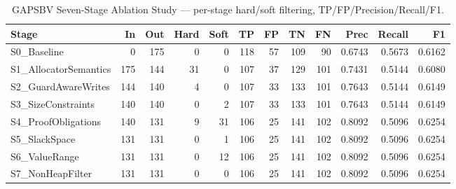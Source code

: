 \begin{table}[t]
\centering
\caption{GAPSBV Seven-Stage Ablation Study — per-stage hard/soft filtering, TP/FP/Precision/Recall/F1.}
\label{tab:gapsbv_ablation}
\begin{tabular}{lrrrrrrrrrrr}
\toprule
Stage & In & Out & Hard & Soft & TP & FP & TN & FN & Prec & Recall & F1 \\
\midrule
  S0_Baseline & 0 & 175 & 0 & 0 & 118 & 57 & 109 & 90 & 0.6743 & 0.5673 & 0.6162 \\
  S1_AllocatorSemantics & 175 & 144 & 31 & 0 & 107 & 37 & 129 & 101 & 0.7431 & 0.5144 & 0.6080 \\
  S2_GuardAwareWrites & 144 & 140 & 4 & 0 & 107 & 33 & 133 & 101 & 0.7643 & 0.5144 & 0.6149 \\
  S3_SizeConstraints & 140 & 140 & 0 & 2 & 107 & 33 & 133 & 101 & 0.7643 & 0.5144 & 0.6149 \\
  S4_ProofObligations & 140 & 131 & 9 & 31 & 106 & 25 & 141 & 102 & 0.8092 & 0.5096 & 0.6254 \\
  S5_SlackSpace & 131 & 131 & 0 & 1 & 106 & 25 & 141 & 102 & 0.8092 & 0.5096 & 0.6254 \\
  S6_ValueRange & 131 & 131 & 0 & 12 & 106 & 25 & 141 & 102 & 0.8092 & 0.5096 & 0.6254 \\
  S7_NonHeapFilter & 131 & 131 & 0 & 0 & 106 & 25 & 141 & 102 & 0.8092 & 0.5096 & 0.6254 \\
\bottomrule
\end{tabular}
\end{table}